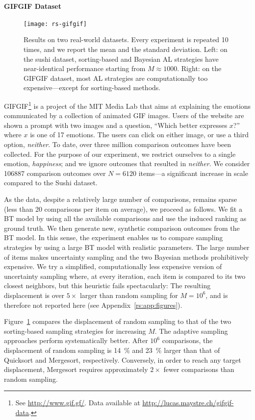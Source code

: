 \paragraph{GIFGIF Dataset}

\begin{figure}[t]
\centering
\texttt{[image: rs-gifgif]}
\caption{
Results on two real-world datasets.
Every experiment is repeated \num{10} times, and we report the mean and the standard deviation.
Left: on the sushi dataset, sorting-based and Bayesian AL strategies have near-identical performance starting from $M \approx \num{1000}$.
Right: on the GIFGIF dataset, most AL strategies are computationally too expensive---except for sorting-based methods.
}
\label{rs:fig:gifgif}
\end{figure}

GIFGIF\footnote{See \url{http://www.gif.gf/}.
Data available at \url{http://lucas.maystre.ch/gifgif-data}.} is a project of the MIT Media Lab that aims at explaining the emotions communicated by a collection of animated GIF images.
Users of the website are shown a prompt with two images and a question, ``Which better expresses $x$?'' where $x$ is one of 17 emotions.
The users can click on either image, or use a third option, \emph{neither}.
To date, over three million comparison outcomes have been collected.
For the purpose of our experiment, we restrict ourselves to a single emotion, \emph{happiness}; and we ignore outcomes that resulted in \emph{neither}.
We consider \num{106887} comparison outcomes over $N = \num{6120}$ items---a significant increase in scale compared to the Sushi dataset.

As the data, despite a relatively large number of comparisons, remains sparse (less than 20 comparisons per item on average), we proceed as follows.
We fit a BT model by using all the available comparisons and use the induced ranking as ground truth.
We then generate new, synthetic comparison outcomes from the BT model.
In this sense, the experiment enables us to compare sampling strategies by using a large BT model with realistic parameters.
The large number of items makes uncertainty sampling and the two Bayesian methods prohibitively expensive.
We try a simplified, computationally less expensive version of uncertainty sampling where, at every iteration, each item is compared to its two closest neighbors, but this heuristic fails spectacularly: The resulting displacement is over $5\times$ larger than random sampling for $M = 10^6$, and is therefore not reported here (see Appendix~\ref{rs:app:figures}). %

Figure~\ref{rs:fig:gifgif} compares the displacement of random sampling to that of the two sorting-based sampling strategies for increasing $M$.
The adaptive sampling approaches perform systematically better.
After $10^6$ comparisons, the displacement of random sampling is \num{14}~\% and \num{23}~\% larger than that of Quicksort and Mergesort, respectively.
Conversely, in order to reach any target displacement, Mergesort requires approximately $2 \times$ fewer comparisons than random sampling.
